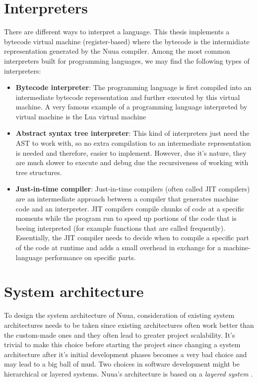 \section{Interpreters}

There are different ways to interpret a language. This thesis implements a bytecode virtual machine (register-based) where the bytecode is the
intermidiate representation generated by the Nuua compiler. Among the most common interpreters built for programming languages, we may find the
following types of interpreters:

\begin{itemize}
    \item \textbf{Bytecode interpreter}: The programming language is first compiled into an intermediate bytecode representation and further executed
        by this virtual machine. A very famous example of a programming language interpreted by virtual machine is the Lua virtual machine \autocite{the_implementation_of_lua}
    \item \textbf{Abstract syntax tree interpreter}: This kind of interpreters just need the AST to work with, so no extra compilation to an intermediate
        representation is needed and therefore, easier to implement. However, due it's nature, they are much slower to execute and debug due the recursiveness
        of working with tree structures.
    \item \textbf{Just-in-time compiler}: Just-in-time compilers (often called JIT compilers) are an intermediate approach between a compiler that generates
    machine code and an interpreter. JIT compilers compile chunks of code at a specific moments while the program run to speed up portions of the code that is beeing interpreted (for example functions that are called frequently). Essentially, the JIT compiler needs to decide when to compile a specific part of the code at runtime and adds a small overhead in exchange for a machine-language performance on specific parts.
\end{itemize}

\section{System architecture}
\label{sec:sys_arch}

To design the system architecture of Nuua, consideration of existing system architectures needs to be taken since existing architectures
often work better than the custom-made ones and they often lead to greater project scalability. It's trivial
to make this choice before starting the project since changing a system architecture after it's initial
development phases becomes a very bad choice and may lead to a big ball of mud. Two choices in software development might be hierarchical
or layered systems. Nuua's architecture is based on a \emph{layered system} \autocite{software_architecture}.

